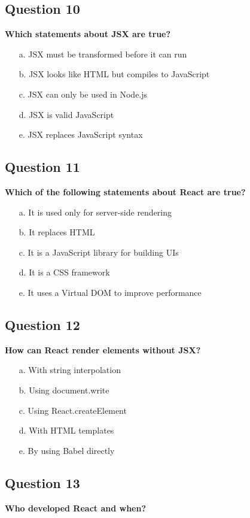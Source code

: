 \documentclass{article}
\begin{document}
\subsection*{Question 10}
\textbf{Which statements about JSX are true?}

\begin{itemize}
  \item[a.] JSX must be transformed before it can run
  \item[b.] JSX looks like HTML but compiles to JavaScript
  \item[c.] JSX can only be used in Node.js
  \item[d.] JSX is valid JavaScript
  \item[e.] JSX replaces JavaScript syntax
\end{itemize}

\subsection*{Question 11}
\textbf{Which of the following statements about React are true?}

\begin{itemize}
  \item[a.] It is used only for server-side rendering
  \item[b.] It replaces HTML
  \item[c.] It is a JavaScript library for building UIs
  \item[d.] It is a CSS framework
  \item[e.] It uses a Virtual DOM to improve performance
\end{itemize}

\subsection*{Question 12}
\textbf{How can React render elements without JSX?}

\begin{itemize}
  \item[a.] With string interpolation
  \item[b.] Using document.write
  \item[c.] Using React.createElement
  \item[d.] With HTML templates
  \item[e.] By using Babel directly
\end{itemize}

\subsection*{Question 13}
\textbf{Who developed React and when?}
\end{document}
